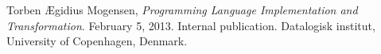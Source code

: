 \begin{thebibliography}{1}


Torben Ægidius Mogensen, \emph{Programming Language Implementation and
Transformation}. February 5, 2013. Internal publication. Datalogisk institut,
University of Copenhagen, Denmark.

\end{thebibliography}

